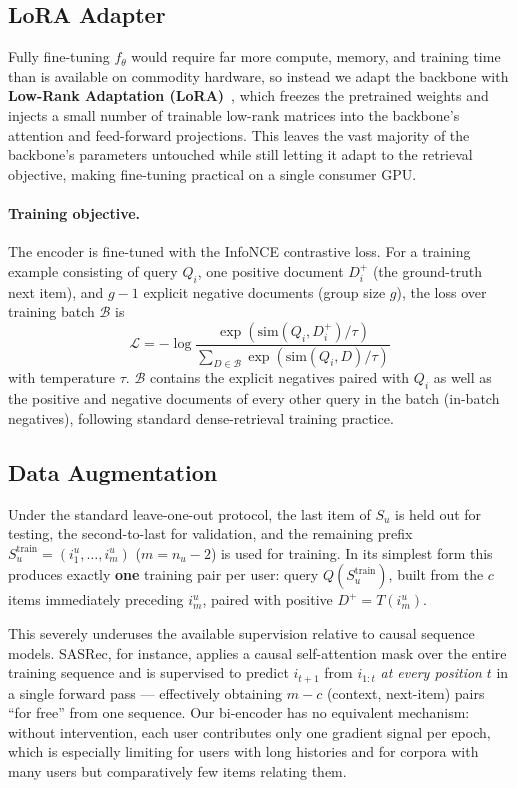 \documentclass[runningheads]{llncs}
\begin{document}
\subsection{LoRA Adapter}
\label{sec:lora}

Fully fine-tuning $f_\theta$ would require far more compute, memory, and training time than is available on commodity hardware, so instead we adapt the backbone with \textbf{Low-Rank Adaptation (LoRA)}~\cite{hu2022}, which freezes the pretrained weights and injects a small number of trainable low-rank matrices into the backbone's attention and feed-forward projections. This leaves the vast majority of the backbone's parameters untouched while still letting it adapt to the retrieval objective, making fine-tuning practical on a single consumer GPU.

\paragraph{Training objective.}
The encoder is fine-tuned with the InfoNCE contrastive loss. For a training example consisting of query $Q_i$, one positive document $D_i^+$ (the ground-truth next item), and $g-1$ explicit negative documents (group size $g$), the loss over training batch $\mathcal{B}$ is
\[
\mathcal{L} = -\log \frac{\exp(\mathrm{sim}(Q_i, D_i^+)/\tau)}{\sum_{D \in \mathcal{B}} \exp(\mathrm{sim}(Q_i, D)/\tau)}
\]
with temperature $\tau$. $\mathcal{B}$ contains the explicit negatives paired with $Q_i$ as well as the positive and negative documents of every other query in the batch (in-batch negatives), following standard dense-retrieval training practice.

\subsection{Data Augmentation}
\label{sec:augmentation}

Under the standard leave-one-out protocol, the last item of $S_u$ is held out for testing, the second-to-last for validation, and the remaining prefix $S_u^{\text{train}} = (i_1^u, \dots,
i_m^u)$ ($m = n_u - 2$) is used for training. In its simplest form this produces exactly \textbf{one} training pair per user: query $Q(S_u^{\text{train}})$, built from the $c$ items
immediately preceding $i_m^u$, paired with positive $D^+ = T(i_m^u)$.

This severely underuses the available supervision relative to causal sequence models. SASRec, for instance, applies a causal self-attention mask over the entire training sequence and is supervised to predict $i_{t+1}$ from $i_{1:t}$ \emph{at every position} $t$ in a single forward pass --- effectively obtaining $m-c$ (context, next-item) pairs ``for free'' from one sequence. Our bi-encoder has no equivalent mechanism: without intervention, each user contributes only one gradient signal per epoch, which is especially limiting for users with long histories and for corpora with many users but comparatively few items relating them.
\end{document}

